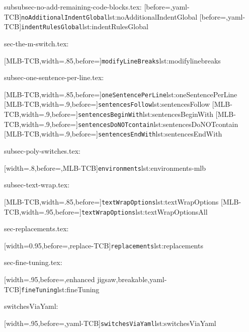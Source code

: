 subsubsec-no-add-remaining-code-blocks.tex:
[before=\centering,yaml-TCB]{\texttt{noAdditionalIndentGlobal}}{lst:noAdditionalIndentGlobal}
[before=\centering,yaml-TCB]{\texttt{indentRulesGlobal}}{lst:indentRulesGlobal}

sec-the-m-switch.tex:

[MLB-TCB,width=.85\linewidth,before=\centering]{\texttt{modifyLineBreaks}}{lst:modifylinebreaks}

subsec-one-sentence-per-line.tex:

[MLB-TCB,width=.85\linewidth,before=\centering]{\texttt{oneSentencePerLine}}{lst:oneSentencePerLine}
[MLB-TCB,width=.9\linewidth,before=\centering]{\texttt{sentencesFollow}}{lst:sentencesFollow}
[MLB-TCB,width=.9\linewidth,before=\centering]{\texttt{sentencesBeginWith}}{lst:sentencesBeginWith}
[MLB-TCB,width=.9\linewidth,before=\centering]{\texttt{sentencesDoNOTcontain}}{lst:sentencesDoNOTcontain}
[MLB-TCB,width=.9\linewidth,before=\centering]{\texttt{sentencesEndWith}}{lst:sentencesEndWith}

subsec-poly-switches.tex:

[width=.8\linewidth,before=\centering,MLB-TCB]{\texttt{environments}}{lst:environments-mlb}

subsec-text-wrap.tex:

[MLB-TCB,width=.85\linewidth,before=\centering]{\texttt{textWrapOptions}}{lst:textWrapOptions}
[MLB-TCB,width=.95\linewidth,before=\centering]{\texttt{textWrapOptions}}{lst:textWrapOptionsAll}

sec-replacements.tex:

[width=0.95\linewidth,before=\centering,replace-TCB]{\texttt{replacements}}{lst:replacements}

sec-fine-tuning.tex:

[width=.95\linewidth,before=\centering,enhanced jigsaw,breakable,yaml-TCB]{\texttt{fineTuning}}{lst:fineTuning}

switchesViaYaml:

[width=.95\linewidth,before=\centering,yaml-TCB]{\texttt{switchesViaYaml}}{lst:switchesViaYaml}
